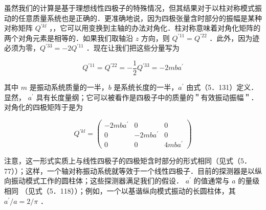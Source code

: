 虽然我们的计算是基于理想线性四极子的特殊情况，但其结果对于以柱对称模式振动的任意质量系统也是正确的．更准确地说，因为四极张量含时部分的振幅是某种对称矩阵 $Q^{\prime k l}$ ，，它可以用变换到主轴的办法对角化．柱对称意味着对角化矩阵的两个对角元素是相等的．如果我们取轴沿 $z$ 方向，则 $Q^{\prime 11}=Q^{\prime 22}$ ．此外，因为迹必须为零，$Q^{\prime 33}=-2 Q^{\prime 11}$ ．现在让我们把这些分量写为


\begin{equation*}
	Q^{\prime 11}=Q^{\prime 22}=-\frac{1}{2} Q^{\prime 33}=-2 m b a^{\prime} \tag{5.131}
\end{equation*}


其中 $m$ 是振动系统质量的一半，$b$ 是系统长度的一半，$a^{\prime}$ 由式（5．131）定义．显然， $a^{\prime}$ 具有长度量纲；它可以被看作是四极子中的质量的＂有效振动振幅＂．对角化的四极矩阵于是为

\[
Q^{\prime k l}=\left(\begin{array}{ccc}
	-2 m b a^{\prime} & 0 & 0  \tag{5.132}\\
	0 & -2 m b a^{\prime} & 0 \\
	0 & 0 & 4 m b a^{\prime}
\end{array}\right)
\]

注意，这一形式实质上与线性四极子的四极矩含时部分的形式相同（见式（5．77））；这样，一个轴对称振动系统就等效于一个线性四极子．目前的探测器是以纵向振动模式工作的圆柱体；这些探测器满足我们的假设． $a^{\prime}$ 的值通常与 $a$ 的量级相同 （见式（5．118））；例如，一个以基谐纵向模式振动的长圆柱体，其 $a^{\prime} / a=2 / \pi$ ．
















\printbibliography[heading=subbibliography,title=第\ref{chle}章参考文献]

\endinput
